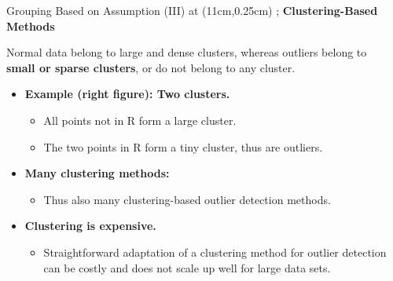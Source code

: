 \begin{frame}{Grouping Based on Assumption (III)}
	\tikzoverlay at (11cm,0.25cm) {};
	\textcolor{faugray}{\textbf{Clustering-Based Methods}}

	Normal data belong to large and dense clusters, whereas outliers belong to\\ \textbf{\color{airforceblue}small or sparse clusters}, or do not belong to any cluster.
	\begin{itemize}

		\item \textbf{Example (right figure): Two clusters.}
		      \begin{itemize}
			      \item All points not in R form a large cluster.
			      \item The two points in R form a tiny cluster, thus are outliers.

		      \end{itemize}
		\item \textbf{Many clustering methods:}
		      \begin{itemize}
			      \item Thus also many clustering-based outlier detection methods.
		      \end{itemize}
		\item \textbf{Clustering is expensive.}
		      \begin{itemize}
			      \item Straightforward adaptation of a clustering method for outlier detection can be costly and does not scale up well for large data sets.
		      \end{itemize}
	\end{itemize}
\end{frame}
